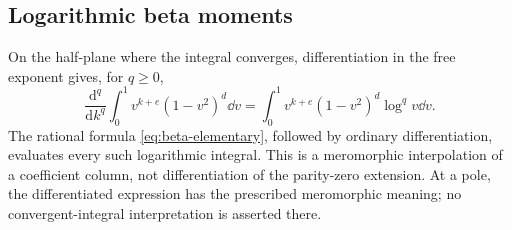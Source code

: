 \subsection{Logarithmic beta moments}

On the half-plane where the integral converges, differentiation in the free exponent gives, for $q\ge0$,
\begin{equation}\label{eq:logbeta}
 \frac{\mathrm d^q}{\mathrm dk^q}
 \int_0^1v^{k+e}(1-v^2)^d\dd v
 =\int_0^1v^{k+e}(1-v^2)^d\log^qv\dd v.
\end{equation}
The rational formula \eqref{eq:beta-elementary}, followed by ordinary differentiation, evaluates every such logarithmic integral. This is a meromorphic interpolation of a coefficient column, not differentiation of the parity-zero extension. At a pole, the differentiated expression has the prescribed meromorphic meaning; no convergent-integral interpretation is asserted there.
